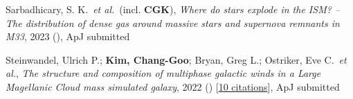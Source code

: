 \item Sarbadhicary, S. K.~\textit{et al.}~(incl. \textbf{CGK}), \textit{Where do stars explode in the ISM? -- The distribution of dense gas around massive stars and supernova remnants in M33}, 2023 (), ApJ submitted

\item Steinwandel, Ulrich P.; \textbf{Kim, Chang-Goo}; Bryan, Greg L.; Ostriker, Eve C.~\textit{et al.}, \textit{The structure and composition of multiphase galactic winds in a Large Magellanic Cloud mass simulated galaxy}, 2022 () [\href{http://adsabs.harvard.edu/abs/2022arXiv221203898S}{10 citations}], ApJ submitted